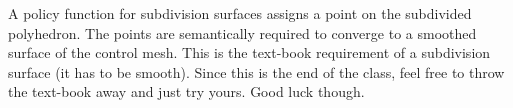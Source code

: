 
A policy function for subdivision surfaces assigns a point on 
the subdivided polyhedron. The points are semantically
required to converge to a smoothed surface of the control mesh.
This is the text-book requirement of a subdivision 
surface (it has to be smooth). Since this is the end of the
class, feel free to throw the text-book away and just try yours. 
Good luck though.


